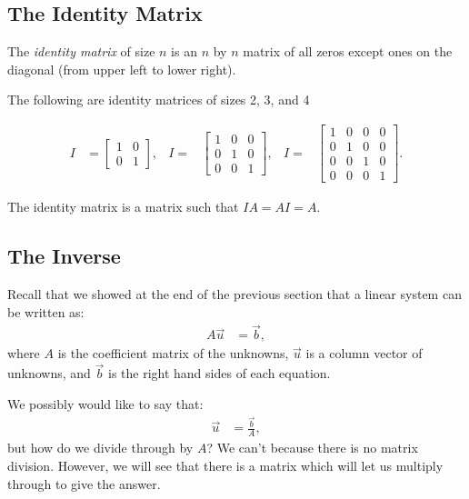 \subsection{The Identity Matrix}

\begin{definition}
The \emph{identity matrix} of size $n$ is an $n$ by $n$ matrix of all zeros except ones on the diagonal (from upper left to lower right).
\end{definition}


  The following are identity matrices of sizes 2, 3, and 4

\begin{align*}
I & =\begin{bmatrix}
1 & 0 \\ 0 & 1
\end{bmatrix},
&I =&
\begin{bmatrix}
1 & 0 & 0 \\ 0 & 1 & 0 \\ 0 & 0 & 1
\end{bmatrix},
&I = &
\begin{bmatrix}
1 & 0 & 0 & 0\\ 0 & 1 & 0 & 0 \\ 0 & 0 & 1 & 0 \\ 0 & 0 & 0 & 1
\end{bmatrix}.
\end{align*}

The identity matrix is a matrix such that $IA = AI = A$.

\subsection{The Inverse}

Recall that we showed at the end of the previous section that a linear system can be written as:
%
\begin{align*}
A \vec{u} & = \vec{b},
\end{align*}
%
where $A$ is the coefficient matrix of the unknowns, $\vec{u}$ is a column vector of unknowns, and $\vec{b}$ is the right hand sides of each equation.

We possibly would like to say that:
%
\begin{align*}
\vec{u} & = \frac{\vec{b}}{A},
\end{align*}
but how do we divide through by $A$?  We can't because there is no matrix division.   However, we will see that there is a matrix which will let us multiply through to give the answer.

